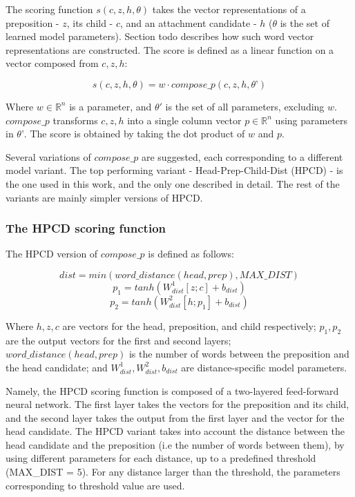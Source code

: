 The scoring function $s(c, z, h, \theta)$ takes the vector representations of a preposition  - $z$, its child - $c$, and an attachment candidate - $h$ ($\theta$ is the set of learned model parameters). Section todo describes how such word vector representations are constructed. The score is defined as a linear function on a vector composed from $c, z, h$:

$$s(c,z,h,\theta) = w \cdot compose\_p(c,z,h, \theta’)$$

Where $w \in \mathbb{R}^n$ is a parameter, and $\theta'$ is the set of all parameters, excluding $w$. $compose\_p$ transforms $c, z, h$ into a single column vector $p \in \mathbb{R}^n$ using parameters in $\theta’$.  The score is obtained by taking the dot product of $w$ and $p$. 

Several variations of $compose\_p$ are suggested, each corresponding to a different model variant. The top performing variant - Head-Prep-Child-Dist (HPCD) - is the one used in this work, and the only one described in detail. The rest of the variants are mainly simpler versions of HPCD.

\subsubsection{The HPCD scoring function}
The HPCD version of $compose\_p$ is defined as follows:

   $$ dist = min(word\_distance(head, prep), MAX\_DIST) $$
   $$ p_1 = tanh(W^1_{dist}[z;c] + b_{dist})   $$
   $$ p_2 = tanh(W^2_{dist}[h;p_1] + b_{dist}) $$

Where $h, z, c$ are vectors for the head, preposition, and child respectively; $p_1, p_2$ are the output vectors for the first and second layers;
$word\_distance(head, prep)$ is the number of words between the preposition and the head candidate; and $ W^1_{dist}, W^2_{dist}, b_{dist}$ are distance-specific model parameters.

Namely, the HPCD scoring function is composed of a two-layered feed-forward neural network. The first layer takes the vectors for the preposition and its child, and the second layer takes the output from the first layer and the vector for the head candidate. The HPCD variant takes into account the distance between the head candidate and the preposition (i.e the number of words between them), by using different parameters for each distance, up to a predefined threshold (MAX\_DIST = 5). For any distance larger than the threshold, the parameters corresponding to threshold value are used.

